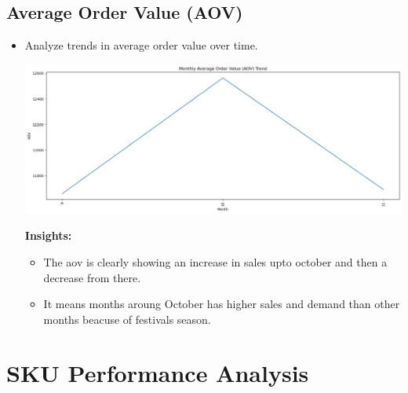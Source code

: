 \documentclass{article}
\begin{document}
    \subsection{Average Order Value (AOV)}
    \begin{itemize}
        \item Analyze trends in average order value over time.{
            \begin{center}
                \includegraphics[width=1\columnwidth]{images/month-aov.png}
            \end{center}
            \textbf{Insights:}
            \begin{itemize}
                \item The aov is clearly showing an increase in sales upto october and then a decrease from there.
                \item It means months aroung October has higher sales and demand than other months beacuse of festivals season.
            \end{itemize}
        }
    \end{itemize}


\section{SKU Performance Analysis}
\end{document}
